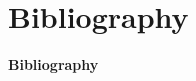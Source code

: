 \documentclass[handout]{beamer}
\begin{document}
\section{Bibliography}

\begin{frame}[t,allowframebreaks]{\bf Bibliography}
\nocite{*}

\end{frame}
\end{document}
